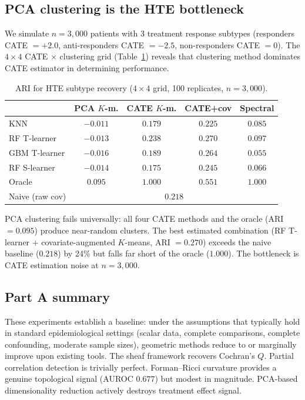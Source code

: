 \documentclass[11pt]{article}
\begin{document}
\subsection{PCA clustering is the HTE bottleneck}
\label{sec:res-hte}

We simulate $n = 3{,}000$ patients with 3 treatment response subtypes (responders CATE $= +2.0$, anti-responders CATE $= -2.5$, non-responders CATE $= 0$).
The $4 \times 4$ CATE $\times$ clustering grid (Table~\ref{tab:hte}) reveals that clustering method dominates CATE estimator in determining performance.

\begin{table}[t]
\centering
\caption{ARI for HTE subtype recovery ($4 \times 4$ grid, 100 replicates, $n = 3{,}000$).}
\label{tab:hte}
\small
\begin{tabular}{@{}lcccc@{}}
\toprule
 & \textbf{PCA $K$-m.} & \textbf{CATE $K$-m.} & \textbf{CATE+cov} & \textbf{Spectral} \\
\midrule
KNN       & $-0.011$ & $0.179$ & $0.225$ & $0.085$ \\
RF T-learner  & $-0.013$ & $0.238$ & $\mathbf{0.270}$ & $0.097$ \\
GBM T-learner & $-0.016$ & $0.189$ & $0.264$ & $0.055$ \\
RF S-learner  & $-0.014$ & $0.175$ & $0.245$ & $0.066$ \\
\midrule
Oracle        & $0.095$  & $1.000$ & $0.551$ & $1.000$ \\
Naive (raw cov) & \multicolumn{4}{c}{$0.218$} \\
\bottomrule
\end{tabular}
\end{table}

PCA clustering fails universally: all four CATE methods and the oracle (ARI $= 0.095$) produce near-random clusters.
The best estimated combination (RF T-learner + covariate-augmented $K$-means, ARI $= 0.270$) exceeds the naive baseline ($0.218$) by 24\% but falls far short of the oracle ($1.000$).
The bottleneck is CATE estimation noise at $n = 3{,}000$.

\subsection{Part A summary}

These experiments establish a baseline: under the assumptions that typically hold in standard epidemiological settings (scalar data, complete comparisons, complete confounding, moderate sample sizes), geometric methods reduce to or marginally improve upon existing tools.
The sheaf framework recovers Cochran's $Q$.
Partial correlation detection is trivially perfect.
Forman--Ricci curvature provides a genuine topological signal (AUROC $0.677$) but modest in magnitude.
PCA-based dimensionality reduction actively destroys treatment effect signal.
\end{document}
